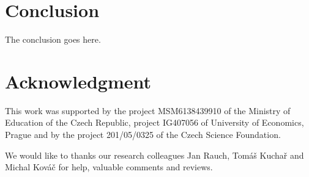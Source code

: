 \documentclass[conference]{IEEEtran}
\begin{document}
\section{Conclusion}
\label{section:conclusion}
The conclusion goes here.

\section*{Acknowledgment}

This work was supported by the project MSM6138439910 of the
Ministry of Education of the Czech Republic, project IG407056 of University
of Economics, Prague and by the project 201/05/0325 of the Czech Science
Foundation. 

We would like to thanks our research colleagues Jan Rauch,
Tom\'{a}\v{s} Kucha\v{r} and Michal Kov\'{a}\v{c} for help, valuable comments 
and reviews.

\end{document}
